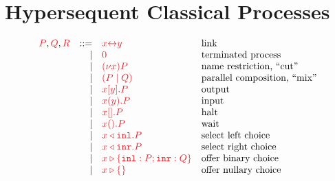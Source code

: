 \documentclass[UKenglish]{llncs}
\begin{document}
\section{Hypersequent Classical Processes}\label{sec:cp-revisited}
\begin{comment}
In this section, we introduce a reformulation of \cp.
To keep the discussion simple, we will only discuss the subset which corresponds
to multiplicative-additive linear logic~\cite[MALL]{girard1987} or rudimentary
linear logic~\cite[RLL]{girard1992}.
We foresee no problems in extending the proofs from \cref{sec:cpnd} to
cover the remaining features of \cp, polymophism and the exponentials $\ty{!A}$
and $\ty{?A}$. 

We deviate from the original presentation of \cp~\parencite{wadler2012} in two ways:
we include the commutativity of links in our structural congruence, as done by
\textcite{paykin2016}; and, inspired by \textcite{lindley2015semantics}, we
exclude the commutative conversions from our reduction system which leads to a 
different notion of canonical form and a reduction strategy closer to that of
the \textpi-calculus.

The term language for \hcp is a variant of the
\textpi-calculus~\parencite{milner1992b}.
\end{comment}
\begin{definition}[Terms]\label{def:hcp-terms}
  \[
    \begin{array}{lrll}
      \tm{P}, \tm{Q}, \tm{R}
        & ::=& \tm{\cpLink{x}{y}}    &\text{link}
      \\&\mid& \tm{\piHalt}          &\text{terminated process}
      \\&\mid& \tm{\piNew{x}{P}}     &\text{name restriction, ``cut''}
      \\&\mid& \tm{( \piPar{P}{Q} )} &\text{parallel composition, ``mix''}
      \\&\mid& \tm{\piSend{x}{y}{P}} &\text{output}
      \\&\mid& \tm{\piRecv{x}{y}{P}} &\text{input}
      \\&\mid& \tm{\piSend{x}{}{P}}  &\text{halt}
      \\&\mid& \tm{\cpWait{x}{}{P}}  &\text{wait}
      \\&\mid& \tm{\cpInl{x}{P}}     &\text{select left choice}
      \\&\mid& \tm{\cpInr{x}{P}}     &\text{select right choice}
      \\&\mid& \tm{\cpCase{x}{P}{Q}} &\text{offer binary choice}
      \\&\mid& \tm{\cpAbsurd{x}}     &\text{offer nullary choice}
    \end{array}
  \]
\end{definition}\noindent
\end{document}
